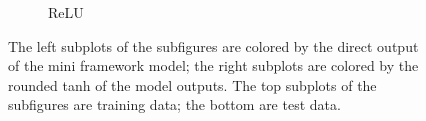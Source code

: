 \documentclass[prl, article, twocolumn]{revtex4-1}
\begin{document}
\begin{figure}[hb!]
\begin{subfigure}[]{0.45\linewidth}
        \caption{ReLU}
    \end{subfigure}
    \caption{The left subplots of the subfigures are colored by the direct output of the mini framework model; the right subplots are colored by the rounded tanh of the model outputs. The top subplots of the subfigures are training data; the bottom are test data.}
    \label{fig:points}
\end{figure}

\vspace{0.8\textwidth}
\end{document}
